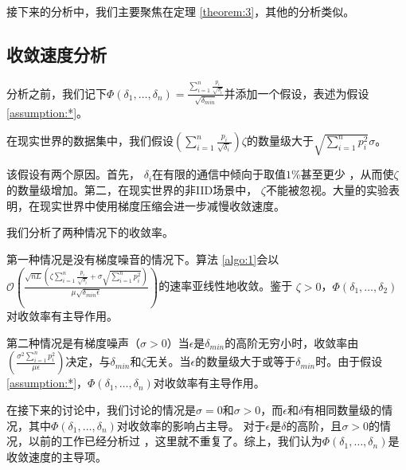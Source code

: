 接下来的分析中，我们主要聚焦在定理 \ref{theorem:3}，其他的分析类似。
\subsection{收敛速度分析}

分析之前，我们记下$\Phi(\delta_1,\ldots,\delta_n)=\frac{\sum_{i=1}^n\frac{p_i}{\sqrt{\delta_i}}}{\sqrt{\delta_{min}}}$并添加一个假设，表述为假设 \ref{assumption:*}。
\begin{assumption}
在现实世界的数据集中，我们假设$(\sum_{i=1}^n\frac{p_i}{\sqrt{\delta_i}})\zeta$的数量级大于$\sqrt{\sum_{i=1}^n p_i^2}\sigma$。
\label{assumption:*}
\end{assumption}
该假设有两个原因。首先， $\delta_i$在有限的通信中倾向于取值$1\%$甚至更少 \cite{dgc,hardthreshold}，从而使$\zeta$的数量级增加。第二，在现实世界的非IID场景中， $\zeta$不能被忽视。大量的实验表明，在现实世界中使用梯度压缩会进一步减慢收敛速度\cite{niid2020icml}。

我们分析了两种情况下的收敛率。

第一种情况是没有梯度噪音的情况下。算法 \ref{algo:1}会以$\mathcal{O}(\frac{\sqrt{n L}(\zeta\sum_{i=1}^n\frac{p_i}{\sqrt{\delta_i}}+\sigma\sqrt{\sum_{i=1}^n p_i^2})}{\mu \sqrt{\delta_{min} \epsilon}})$的速率亚线性地收敛。鉴于 $\zeta > 0$，$\Phi(\delta_1,\ldots,\delta_2)$对收敛率有主导作用。

第二种情况是有梯度噪声（$\sigma>0$）当$\epsilon$是$\delta_{min}$的高阶无穷小时，收敛率由$(\frac{\sigma^2\sum_{i=1}^n p_i^2}{\mu \epsilon})$决定，与$ \delta_{min}$和$\zeta$无关。当$\epsilon$的数量级大于或等于$\delta_{min}$时。由于假设 \ref{assumption:*}，$\Phi(\delta_1,\ldots,\delta_n)$对收敛率有主导作用。

在接下来的讨论中，我们讨论的情况是$\sigma=0$和$\sigma > 0$，而$\epsilon$和$\delta$有相同数量级的情况，其中$\Phi(\delta_1,\ldots,\delta_n)$对收敛率的影响占主导。
对于$\epsilon$是$\delta$的高阶，且$\sigma > 0$的情况，以前的工作已经分析过 \cite{stich2019error,stich2018sparsified,karimireddy2019error}，这里就不重复了。综上，我们认为$\Phi(\delta_1,\ldots,\delta_n)$是收敛速度的主导项。



